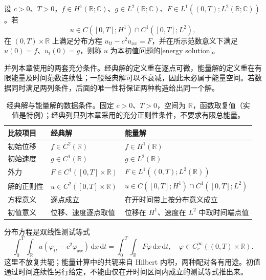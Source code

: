\begin{definition}\label{b2:def:09-energy-solution}
设 \(c>0\)、\(T>0\)，\(f\in H^1(\mathbb R;\mathbb C)\)、\(g\in L^2(\mathbb R;\mathbb C)\)、\(F\in L^1((0,T);L^2(\mathbb R;\mathbb C))\)。若
\[
 u\in C([0,T];H^1)\cap C^1([0,T];L^2),
\]
在 \((0,T)\times\mathbb R\) 上满足分布方程 \(u_{tt}-c^2u_{xx}=F\)，并在所示范数意义下满足 \(u(0)=f\)、\(u_t(0)=g\)，则称 \(u\) 为本初值问题的[energy solution]。
\end{definition}

并列本章使用的两套充分条件。经典解的定义重在逐点可微，能量解的定义重在有限能量及时间范数连续性；一般经典解可以不衰减，因此未必属于能量空间。若数据同时满足两列条件，后面的唯一性将保证两种构造给出同一个解。

\begin{table}[htbp]
\centering
\small
\setlength{\tabcolsep}{5pt}
\caption[经典解与能量解的数据条件]{经典解与能量解的数据条件。固定 \(c>0\)、\(T>0\)，空间为 \(\mathbb R\)，函数取复值（实值是特例）；经典列只列本章采用的充分正则性条件，不要求有限总能量。}
\label{b2:tab:09-solution-classes}
\begin{tabularx}{\linewidth}{@{}>{\raggedright\arraybackslash}p{2.0cm}>{\raggedright\arraybackslash}X>{\raggedright\arraybackslash}X@{}}
\toprule
比较项目 & 经典解 & 能量解 \\
\midrule
初始位移 & \(f\in C^2(\mathbb R)\) & \(f\in H^1(\mathbb R)\) \\
初始速度 & \(g\in C^1(\mathbb R)\) & \(g\in L^2(\mathbb R)\) \\
外力 & \(F\in C^1([0,T]\times\mathbb R)\) & \(F\in L^1((0,T);L^2(\mathbb R))\) \\
解的正则性 & \(u\in C^2([0,T]\times\mathbb R)\) & \(u\in C([0,T];H^1)\cap C^1([0,T];L^2)\) \\
方程意义 & 逐点成立 & 在开时间带上按分布意义成立 \\
初值意义 & 位移、速度逐点取值 & 位移在 \(H^1\)、速度在 \(L^2\) 中取时间端点值 \\
\bottomrule
\end{tabularx}
\end{table}

分布方程是双线性测试等式
\[
 \int_0^T\int_{\mathbb R}u(\varphi_{tt}-c^2\varphi_{xx})\,\mathrm{d}x\,\mathrm{d}t
 =\int_0^T\int_{\mathbb R}F\varphi\,\mathrm{d}x\,\mathrm{d}t,
 \quad \varphi\in C_c^\infty((0,T)\times\mathbb R).
\]
这里不放复共轭；能量计算中的共轭来自 Hilbert 内积，两种配对各有用途。初值通过时间连续性另行给定，不能由仅在开时间区间内成立的测试等式推出来。


